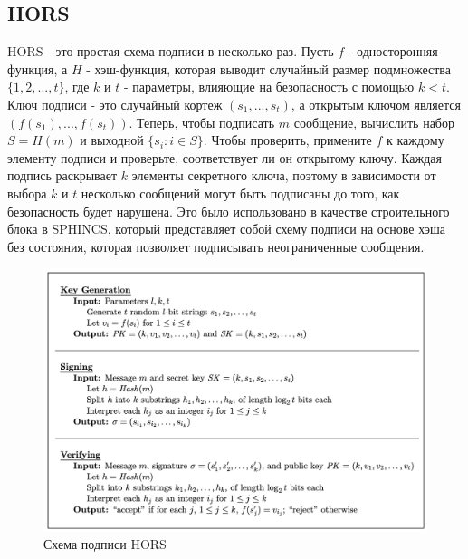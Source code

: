 \documentclass[a4paper, 14pt]{extarticle}
\begin{document}
\subsection{HORS}
HORS - это простая схема подписи в несколько раз. Пусть $f$ - односторонняя функция, а $H$ - хэш-функция, которая выводит случайный размер подмножества $\{1,2,...,t\}$, где $k$ и $t$ - параметры, влияющие на безопасность с помощью $k < t$. Ключ подписи - это случайный кортеж $(s_1,...,s_t)$, а открытым ключом является $(f(s_{1}),..., f(s_{t}))$. 
Теперь, чтобы подписать $m$ сообщение, вычислить набор $S = H(m)$ и выходной $\{s_{i} : i \in S\}$. Чтобы проверить, примените $f$ к каждому элементу подписи и проверьте, соответствует ли он открытому ключу. Каждая подпись раскрывает $k$ элементы секретного ключа, поэтому в зависимости от выбора $k$ и $t$ несколько сообщений могут быть подписаны до того, как безопасность будет нарушена. Это было использовано в качестве строительного блока в SPHINCS, который представляет собой схему подписи на основе хэша без состояния, которая позволяет подписывать неограниченные сообщения.

\begin{figure}[h]
    \centering
    \includegraphics[scale=0.66]{HORS.png}
    \caption{Схема подписи HORS}
    \label{fig:hors}
\end{figure}
\end{document}
